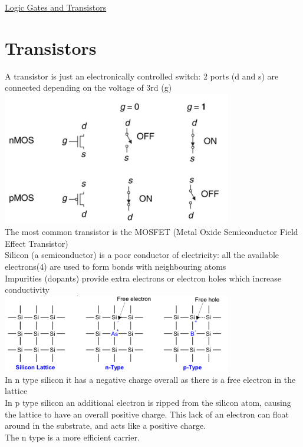 \documentclass{article}[18pt]
\begin{document}
\begin{center}
\underline{\huge Logic Gates and Transistors}
\end{center}

\section{Transistors}
A transistor is just an electronically controlled switch: 2 ports (d and s) are connected depending on the voltage of 3rd (g)\\
\includegraphics[width=10cm]{Fig1.png}\\
The most common transistor is the MOSFET (Metal Oxide Semiconductor Field Effect Transistor)\\
Silicon (a semiconductor) is a poor conductor of electricity: all the available electrons(4) are used to form bonds with neighbouring atoms\\
Impurities (dopants) provide extra electrons or electron holes which increase conductivity\\
\includegraphics[width=10cm]{Fig2.png}\\
In n type silicon it has a negative charge overall as there is a free electron in the lattice\\
In p type silicon an additional electron is ripped from the silicon atom, causing the lattice to have an overall positive charge. This lack of an electron can float around in the substrate, and acts like a positive charge.\\
The n type is a more efficient carrier.
\end{document}
